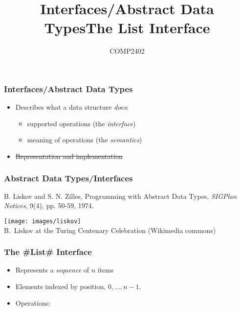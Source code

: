 \documentclass[aspectratio=169,xcolor=dvipsnames]{beamer}
\title{Interfaces/Abstract Data Types}
\author{COMP2402}
\date{}
\begin{document}
\begin{frame}
  \titlepage
\end{frame}

\begin{frame}
  \frametitle{Interfaces/Abstract Data Types}
 
  \begin{itemize}
   \item<+->Describes what a data structure \emph{does}:
     \begin{itemize}
        \item<+->supported operations (the \emph{interface})
        \item<+->meaning of operations (the \emph{semantics})
     \end{itemize}
   \item<+-> \sout{Representation and implementation}
        \end{itemize}
\end{frame}

\begin{frame}
  \frametitle{Abstract Data Types/Interfaces}

   B. Liskov and S. N. Zilles, Programming with Abstract Data Types, \emph{SIGPlan Notices}, 9(4), pp. 50-59, 1974.\\
  \begin{center}
   \texttt{[image: images/liskov]}\\
   B.~Liskov at the Turing Centenary Celebration (Wikimedia commons)
  \end{center}
\end{frame}

\begin{frame}
\title{The List Interface}
\maketitle
\end{frame}


\begin{frame}

  \frametitle{The #List# Interface}
 
  \begin{itemize}
    \item<+-> Represents a \emph{sequence} of $n$ items\newline
    \item<+-> Elements indexed by position, $0,\ldots,n-1$.
    \item<+-> Operations: %
  \end{itemize}
     \begin{center}
     \end{center}

\end{frame}
\end{document}
